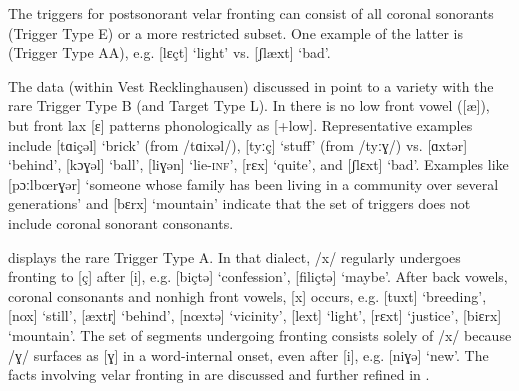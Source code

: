 The triggers for postsonorant velar fronting can consist of all coronal sonorants (Trigger Type E) or a more restricted subset.  One example of the latter is  (Trigger Type AA), e.g. [lɛçt] ‘light’ vs. [ʃlæxt] ‘bad’.

The  data (within Vest Recklinghausen) discussed in \citet{Hellberg1936} point to a variety with the rare Trigger Type B (and Target Type L). In  there is no low front vowel ([æ]), but front lax [ɛ] patterns phonologically as [+low]. Representative examples include [tɑiçəl] ‘brick’ (from /tɑixəl/), [tyːç] ‘stuff’ (from /tyːɣ/) vs. [ɑxtər] ‘behind’, [kɔɣəl] ‘ball’, [liɣən] ‘lie\textsc{{}-inf}’, [rɛx] ‘quite’, and [ʃlɛxt] ‘bad’. Examples like [pɔːlbœrɣər] ‘someone whose family has been living in a community over several generations’ and [bɛrx] ‘mountain’ indicate that the set of triggers does not include coronal sonorant consonants.

 displays the rare Trigger Type A. In that dialect, /x/ regularly undergoes fronting to [ç] after [i], e.g. [biçtə] ‘confession’, [filiçtə] ‘maybe’. After back vowels, coronal consonants and nonhigh front vowels, [x] occurs, e.g. [tuxt] ‘breeding’, [nox] ‘still’, [æxtr̩] ‘behind’, [nœxtə] ‘vicinity’, [lext] ‘light’, [rɛxt] ‘justice’, [biɛrx] ‘mountain’. The set of segments undergoing fronting consists solely of /x/ because /ɣ/ surfaces as [ɣ] in a word-internal onset, even after [i], e.g. [niɣə] ‘new’. The facts involving velar fronting in  are discussed and further refined in .\largerpage

